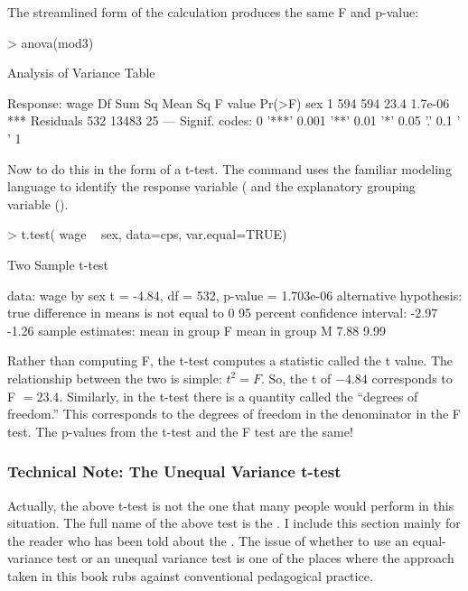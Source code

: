 The streamlined form of the calculation produces the same F and p-value:
\begin{Schunk}
\begin{Sinput}
> anova(mod3)
\end{Sinput}
\begin{Soutput}
Analysis of Variance Table

Response: wage
           Df Sum Sq Mean Sq F value  Pr(>F)    
sex         1    594     594    23.4 1.7e-06 ***
Residuals 532  13483      25                    
---
Signif. codes:  0 '***' 0.001 '**' 0.01 '*' 0.05 '.' 0.1 ' ' 1 
\end{Soutput}
\end{Schunk}

Now to do this in the form of a t-test.  The command uses the familiar
modeling language to identify the response variable ( and
the explanatory grouping variable ().
\begin{Schunk}
\begin{Sinput}
> t.test( wage ~ sex, data=cps, var.equal=TRUE)
\end{Sinput}
\begin{Soutput}
	Two Sample t-test

data:  wage by sex 
t = -4.84, df = 532, p-value = 1.703e-06
alternative hypothesis: true difference in means is not equal to 0 
95 percent confidence interval:
 -2.97 -1.26 
sample estimates:
mean in group F mean in group M 
           7.88            9.99 
\end{Soutput}
\end{Schunk}
Rather than computing F, the t-test computes a statistic called the t
value.  The relationship between the two is simple: $t^2 = F$.  So,
the t of $-4.84$ corresponds to F $=23.4$.
Similarly, in the t-test there is a quantity called the ``degrees of
freedom.''  This corresponds to the degrees of freedom in the
denominator in the F test.  The p-values from the t-test and the F
test are the same!

\subsubsection{Technical Note: The Unequal Variance t-test}
\label{sec:unequal-variance-t-test}

Actually, the above t-test is not the one that many people would
perform in this situation.  The full name of the above test is the
. 
I include this section mainly for the
reader who has been told about the 
.
The issue of whether to use an equal-variance test or an unequal
variance test is one of the places where the approach taken in this
book rubs against conventional pedagogical practice.  

